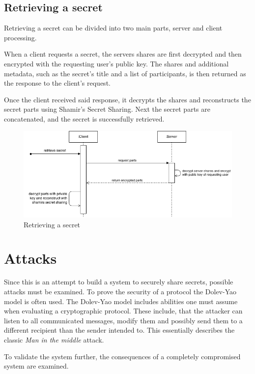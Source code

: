 \subsection{Retrieving a secret}

Retrieving a secret can be divided into two main parts, server and client
processing.

When a client requests a secret, the servers shares are first decrypted and
then encrypted with the requesting user's public key. The shares and additional
metadata, such as the secret's title and a list of participants, is then
returned as the response to the client's request.

Once the client received said response, it decrypts the shares and reconstructs
the secret parts using Shamir's Secret Sharing. Next the secret parts are
concatenated, and the secret is successfully retrieved.

\begin{figure}
  \includegraphics[scale=0.55]{pictures/retrieve_secret_sequence_diagram.png}
  \caption{Retrieving a secret}
  \label{fig:retrieving_a_secret}
\end{figure}

\section{Attacks}

Since this is an attempt to build a system to securely share secrets, possible
attacks must be examined. To prove the security of a protocol the Dolev-Yao
model is often used. The Dolev-Yao model includes abilities one must assume
when evaluating a cryptographic protocol. These include, that the attacker can
listen to all communicated messages, modify them and possibly send them to a
different recipient than the sender intended to. This essentially describes the
classic \textit{Man in the middle} attack.

To validate the system further, the consequences of a completely compromised
system are examined.


